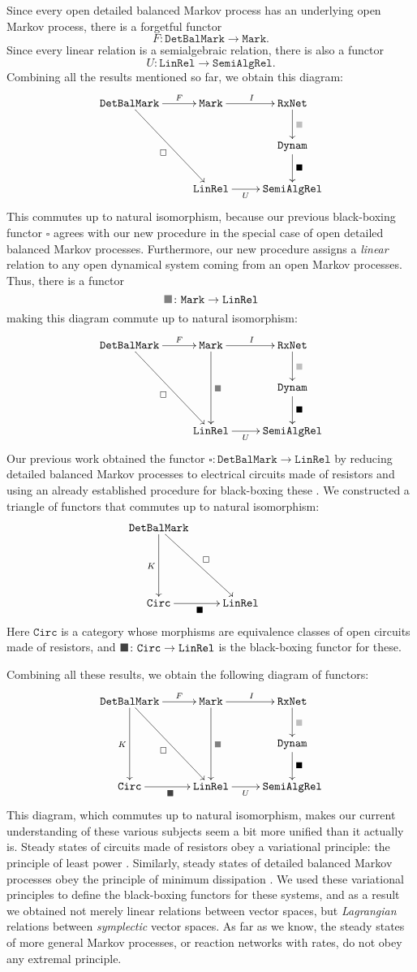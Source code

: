 \documentclass{compositionalityarticle}
\newcommand{\RxNet}{\mathtt{RxNet}}
\newcommand{\Dynam}{\mathtt{Dynam}}
\newcommand{\Mark}{\mathtt{Mark}}
\newcommand{\DetBalMark}{\mathtt{DetBalMark}}
\newcommand{\LinRel}{\mathtt{LinRel}}
\newcommand{\SemiAlgRel}{\mathtt{SemiAlgRel}}
\newcommand{\Circ}{\mathtt{Circ}}
\newcommand*{\darkgraysquare}{\textcolor{gray}{\blacksquare}}
\newcommand*{\vdarkgraysquare}{\textcolor{darkgray}{\blacksquare}}
\newcommand*{\graysquare}{\textcolor{lightgray}{\blacksquare}}
\newcommand{\maps}{\colon}
\theoremstyle{plain}
\theoremstyle{remark}
\begin{document}
Since every open detailed balanced Markov process has an underlying open Markov process, there is a forgetful functor 
\[     F \maps \DetBalMark \to \Mark . \]
Since every linear relation is a semialgebraic relation, there is also a functor
\[     U \maps \LinRel \to \SemiAlgRel . \]
Combining all the results mentioned so far, we obtain this diagram:
\[ 
\xymatrix{
\DetBalMark \ar[r]^-F \ar[ddr]_{\square} & \Mark \ar[r]^I & \RxNet  \ar[d]^{\graysquare} \\ 
& &   \Dynam \ar[d]^{\blacksquare} \\
& \LinRel \ar[r]_-U & \SemiAlgRel 
}
\]
This commutes up to natural isomorphism, because our previous black-boxing functor $\square$ agrees with our new procedure in the special case of open detailed balanced Markov processes.  Furthermore, our new procedure assigns a \emph{linear} relation to any open dynamical system coming from an open Markov processes.  Thus, there is a functor 
\[           \darkgraysquare \maps \Mark \to \LinRel  \]
making this diagram commute up to natural isomorphism:
\[ 
\xymatrix{
\DetBalMark \ar[r]^-F \ar[ddr]_{\square} & \Mark \ar[r]^I  \ar[dd]^{\darkgraysquare} & \RxNet  \ar[d]^{\graysquare} \\ 
& &   \Dynam \ar[d]^{\blacksquare} \\
& \LinRel \ar[r]_-U & \SemiAlgRel 
}
\]
Our previous work obtained the functor $\square \maps \DetBalMark \to \LinRel$ by reducing
detailed balanced Markov processes to electrical circuits made of resistors and using an already established procedure for black-boxing these \cite{BaezFong}.   We constructed a triangle of functors that commutes up to natural isomorphism:
\[ 
\xymatrix{
\DetBalMark \ar[dd]_K \ar[ddr]^{\square}  \\ 
& &   \\
\Circ \ar[r]_{\blacksquare} & \LinRel 
}
\]
Here $\Circ$ is a category whose morphisms are equivalence classes of open circuits made of
resistors, and $\vdarkgraysquare \maps \Circ \to \LinRel$ is the black-boxing functor for these.

Combining all these results, we obtain the following diagram of functors:
\[ 
\xymatrix{
\DetBalMark \ar[dd]_K \ar[r]^-F \ar[ddr]_{\square} & \Mark \ar[r]^I  \ar[dd]^{\darkgraysquare} & \RxNet  \ar[d]^{\graysquare} \\ 
& &   \Dynam \ar[d]^{\blacksquare} \\
\Circ \ar[r]_{\vdarkgraysquare} & \LinRel \ar[r]_-U & \SemiAlgRel 
}
\]
This diagram, which commutes up to natural isomorphism, makes our current understanding of these various subjects seem a bit more unified than it actually is.  Steady states of circuits made of resistors obey a variational principle: the principle of least power \cite{BaezFong}.  Similarly, steady states of detailed balanced Markov processes obey the principle of minimum dissipation \cite{BaezFongPollard}.  We used these variational principles to define the black-boxing functors for these systems, and as a result we obtained not merely linear relations between vector spaces, but \emph{Lagrangian} relations between \emph{symplectic} vector spaces.  As far as we know, the steady states of more general Markov processes, or reaction networks with rates, do not obey any extremal principle. 
\end{document}
